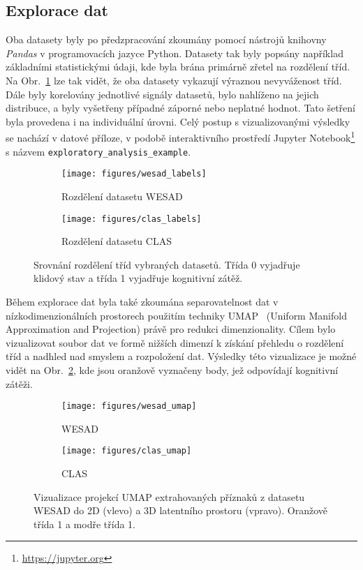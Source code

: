 \subsection{Explorace dat}
\label{subsec:explorace_dat}
Oba datasety byly po předzpracování zkoumány pomocí nástrojů knihovny
\textit{Pandas} v programovacích jazyce Python. Datasety tak byly popsány
například základními statistickými údaji, kde byla brána primárně zřetel na
rozdělení tříd. Na Obr.~\ref{fig:rozdeleni_trid} lze tak vidět, že oba datasety
vykazují výraznou nevyváženost tříd. Dále byly korelovány jednotlivé signály
datasetů, bylo nahlíženo na jejich distribuce, a byly vyšetřeny případné záporné
nebo neplatné hodnot. Tato šetření byla provedena i na individuální úrovni. Celý
postup s vizualizovanými výsledky se nachází v datové příloze, v podobě
interaktivního prostředí Jupyter Notebook\footnote{\url{https://jupyter.org}} s
názvem \texttt{exploratory\_analysis\_example}.

\begin{figure}[h]
    \begin{subfigure}[h]{0.48\linewidth}
        \texttt{[image: figures/wesad\_labels]}
        \caption{Rozdělení datasetu WESAD}
    \end{subfigure}
    \hfill
    \begin{subfigure}[h]{0.48\linewidth}
        \texttt{[image: figures/clas\_labels]}
        \caption{Rozdělení datasetu CLAS}
    \end{subfigure}
    \caption{Srovnání rozdělení tříd vybraných datasetů. Třída 0 vyjadřuje
    klidový stav a třída 1 vyjadřuje kognitivní zátěž.}
    \label{fig:rozdeleni_trid}
\end{figure}

Během explorace dat byla také zkoumána separovatelnost dat v
nízkodimenzionálních prostorech použitím techniky \gls{UMAP}~\cite{umap2018}
(Uniform Manifold Approximation and Projection) právě pro redukci
dimenzionality. Cílem bylo vizualizovat soubor dat ve formě nižších dimenzí k
získání přehledu o rozdělení tříd a nadhled nad smyslem a rozpoložení dat.
Výsledky této vizualizace je možné vidět na Obr.~\ref{fig:umap}, kde jsou
oranžově vyznačeny body, jež odpovídají kognitivní zátěži.

\begin{figure}[h]
    \begin{subfigure}[h]{0.48\linewidth}
        \texttt{[image: figures/wesad\_umap]}
        \caption{WESAD}
    \end{subfigure}
    \hfill
    \begin{subfigure}[h]{0.48\linewidth}
        \texttt{[image: figures/clas\_umap]}
        \caption{CLAS}
    \end{subfigure}
    \caption{Vizualizace projekcí UMAP extrahovaných příznaků z datasetu WESAD
    do 2D (vlevo) a 3D latentního prostoru (vpravo). Oranžově třída 1 a modře
    třída 1.}
    \label{fig:umap}
\end{figure}

